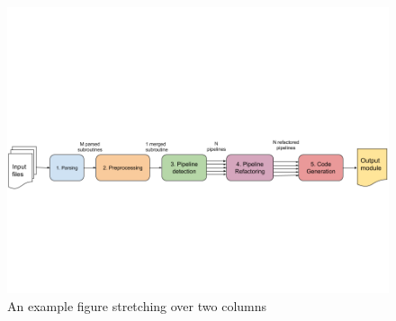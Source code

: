 \documentclass{mpaper}
\begin{document}
\begin{figure}
\begin{center}
\includegraphics[scale=0.5]{images/Compilation_flow.png}
\end{center}
\caption{\label{fig-eg}An example figure stretching over two columns}
\end{figure}



\end{document}
